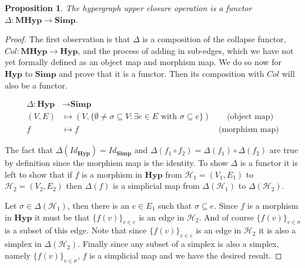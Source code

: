 \documentclass{amsart}
\newtheorem{proposition}[theorem]{Proposition}
\newcommand{\Simp}{\mathrm{\textbf{Simp}}}
\newcommand{\Hyp}{\mathrm{\textbf{Hyp}}}
\newcommand{\MHyp}{\mathrm{\textbf{MHyp}}}
\renewcommand{\H}{\mathcal{H}}
\begin{document}
\begin{proposition}\label{prop:closure_functor}
The hypergraph upper closure operation is a functor $\Delta : \MHyp \rightarrow \Simp$.
\end{proposition}
\begin{proof}
The first observation is that $\Delta$ is a composition of the collapse functor, $Col:\MHyp\rightarrow\Hyp$, and the process of adding in sub-edges, which we have not yet formally defined as an object map and morphism map. We do so now for $\Hyp$ to $\Simp$ and prove that it is a functor. Then its composition with $Col$ will also be a functor.
\begin{samepage}
\begin{align*}
    \Delta : \Hyp& \rightarrow \Simp\\
        (V, E)& \mapsto (V, \{\emptyset \neq \sigma \subseteq V : \exists e \in E \text{ with }\sigma \subseteq e\}) \hspace{2em} \textrm{(object map)}\\
        f& \mapsto f \hspace{17em} \textrm{(morphism map)}
\end{align*}
\end{samepage}

The fact that $\Delta(Id_\Hyp) = Id_\Simp$ and $\Delta(f_1\circ f_2) = \Delta(f_1)\circ\Delta(f_2)$ are true by definition since the morphism map is the identity. To show $\Delta$ is a functor it is left to show that if $f$ is a morphism in $\Hyp$ from $\H_1=(V_1, E_1)$ to $\H_2=(V_2, E_2)$ then $\Delta(f)$ is a simplicial map from $\Delta(\H_1)$ to $\Delta(\H_2)$. 

Let $\sigma \in \Delta(\H_1)$, then there is an $e \in E_1$ such that $\sigma \subseteq e$. Since $f$ is a morphism in $\Hyp$ it must be that $\{f(v)\}_{v \in e}$ is an edge in $\H_2$. And of course $\{f(v)\}_{v \in \sigma}$ is a subset of this edge.
Note that since $\{f(v)\}_{v \in e}$ is an edge in $\H_2$ it is also a simplex in $\Delta(\H_2)$. Finally since any subset of a simplex is also a simplex, namely $\{f(v)\}_{v \in \sigma}$, $f$ is a simplicial map and we have the desired result. 



\end{proof}
\end{document}
